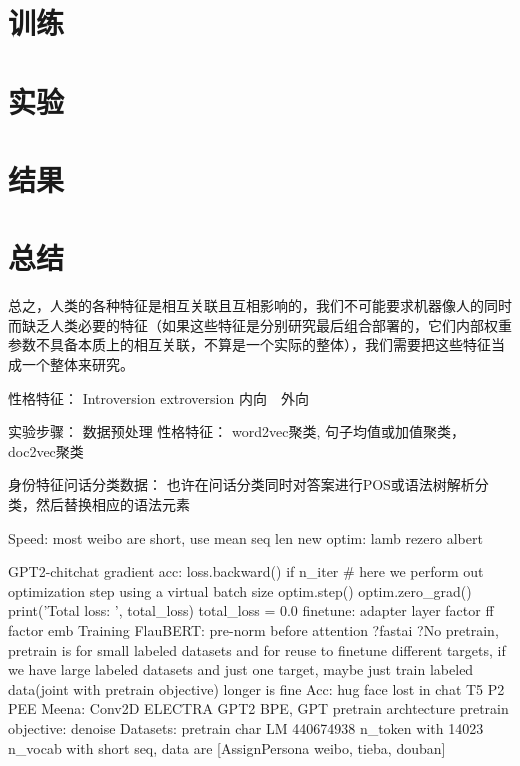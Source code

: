\documentclass[letterpaper]{article} %
\begin{document}
\begin{CJK*}{UTF8}{gbsn}
\section{训练}

\section{实验}

\section{结果}

\section{总结}

总之，人类的各种特征是相互关联且互相影响的，我们不可能要求机器像人的同时而缺乏人类必要的特征（如果这些特征是分别研究最后组合部署的，它们内部权重参数不具备本质上的相互关联，不算是一个实际的整体），我们需要把这些特征当成一个整体来研究。

性格特征：
Introversion extroversion 
内向　外向

实验步骤：
数据预处理
  性格特征：
    word2vec聚类, 句子均值或加值聚类，doc2vec聚类

  身份特征问话分类数据：
    也许在问话分类同时对答案进行POS或语法树解析分类，然后替换相应的语法元素

  Speed:
      most weibo are short, use mean seq len 
      new optim: lamb
      rezero
      albert 

      GPT2-chitchat
      gradient acc:
         loss.backward() 
         if n_iter %
            # here we perform out optimization step using a virtual batch size
            optim.step()
            optim.zero_grad()
            print('Total loss: ', total_loss)
            total_loss = 0.0
      finetune: adapter layer
      factor ff
      factor emb
      Training FlauBERT: pre-norm before attention
      ?fastai
      ?No pretrain, pretrain is for small labeled datasets and for reuse to finetune different targets, 
        if we have large labeled datasets and just one target,
        maybe just train labeled data(joint with pretrain objective) longer is fine
  Acc:
      hug face
      lost in chat
      T5
      P2
      PEE
      Meena: Conv2D
      ELECTRA
      GPT2 BPE, GPT pretrain
      archtecture
      pretrain objective: denoise
  Datasets:
      pretrain char LM 440674938 n_token with 14023 n_vocab with short seq, data are [AssignPersona weibo, tieba, douban]


\end{CJK*}
\end{document}
